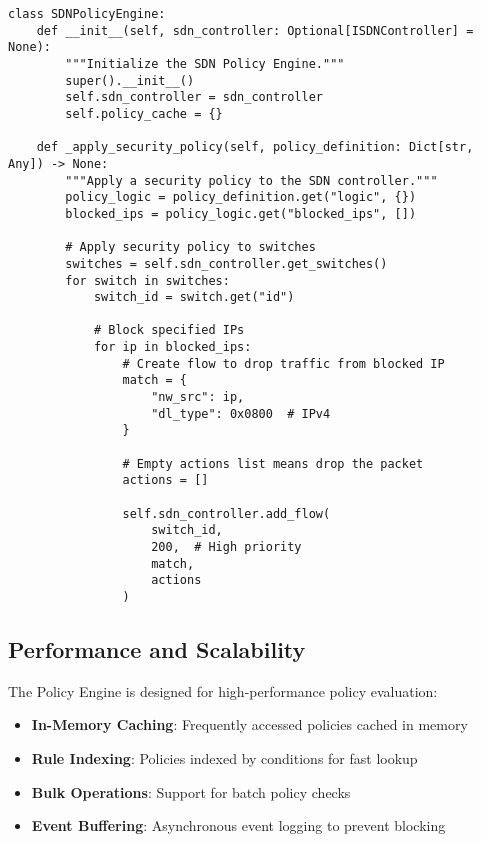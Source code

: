 \begin{lstlisting}[style=pythoncode, caption=SDN Controller Policy Integration]
class SDNPolicyEngine:
    def __init__(self, sdn_controller: Optional[ISDNController] = None):
        """Initialize the SDN Policy Engine."""
        super().__init__()
        self.sdn_controller = sdn_controller
        self.policy_cache = {}
        
    def _apply_security_policy(self, policy_definition: Dict[str, Any]) -> None:
        """Apply a security policy to the SDN controller."""
        policy_logic = policy_definition.get("logic", {})
        blocked_ips = policy_logic.get("blocked_ips", [])
        
        # Apply security policy to switches
        switches = self.sdn_controller.get_switches()
        for switch in switches:
            switch_id = switch.get("id")
            
            # Block specified IPs
            for ip in blocked_ips:
                # Create flow to drop traffic from blocked IP
                match = {
                    "nw_src": ip,
                    "dl_type": 0x0800  # IPv4
                }
                
                # Empty actions list means drop the packet
                actions = []
                
                self.sdn_controller.add_flow(
                    switch_id,
                    200,  # High priority
                    match,
                    actions
                )
\end{lstlisting}

\subsection{Performance and Scalability}

The Policy Engine is designed for high-performance policy evaluation:

\begin{itemize}
    \item \textbf{In-Memory Caching}: Frequently accessed policies cached in memory
    \item \textbf{Rule Indexing}: Policies indexed by conditions for fast lookup
    \item \textbf{Bulk Operations}: Support for batch policy checks
    \item \textbf{Event Buffering}: Asynchronous event logging to prevent blocking
\end{itemize}

